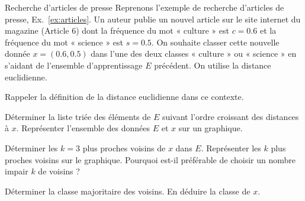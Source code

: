 \documentclass[12pt,fancy]{cours}
\begin{document}
\begin{exemple}{Recherche d'articles de presse}
    Reprenons l'exemple de recherche d'articles de presse, Ex.~\ref{ex:articles}. Un auteur publie un nouvel article sur le site internet du magazine (Article 6) dont la fréquence du mot « culture » est $c=0.6$ et la fréquence du mot « science » est $s=0.5$. On souhaite classer cette nouvelle donnée $x=(0.6,0.5)$ dans l'une des deux classes « culture » ou « science » en s'aidant de l'ensemble d'apprentissage $E$ précédent. On utilise la distance euclidienne.


    \begin{quest}
        \item Rappeler la définition de la distance euclidienne dans ce contexte.
        \item Déterminer la liste triée des éléments de $E$ suivant l'ordre croissant des distances à $x$. Représenter l'ensemble des données $E$ et $x$ sur un graphique.
        \item Déterminer les $k=3$ plus proches voisins de $x$ dans $E$. Représenter les $k$ plus proches voisins sur le graphique. Pourquoi est-il préférable de choisir un nombre impair $k$ de voisins ?
        \item Déterminer la classe majoritaire des voisins. En déduire la classe de $x$.
    \end{quest}


\end{exemple}
\end{document}
